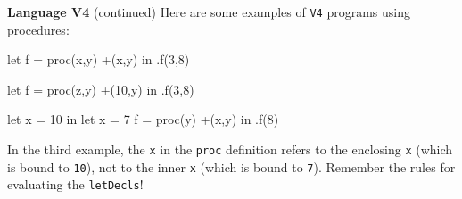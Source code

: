 \begin{minipage}[t]{\sw}
\slidenumber
\LARGE
{\bf Language V4} (continued)\exx
Here are some examples of \verb'V4' programs using procedures:
\large
\begin{qv}
let
  f = proc(x,y) +(x,y)
in
  .f(3,8)

let
  f = proc(z,y) +(10,y)
in
  .f(3,8)

let x = 10
in
  let
    x = 7
    f = proc(y) +(x,y)
  in
    .f(8)
\end{qv}
\LARGE
In the third example, the \verb'x' in the \verb'proc' definition
refers to the enclosing \verb'x' (which is bound to \verb'10'),
not to the inner \verb'x' (which is bound to \verb'7').
Remember the rules for evaluating the \verb'letDecls'!
\end{minipage}
